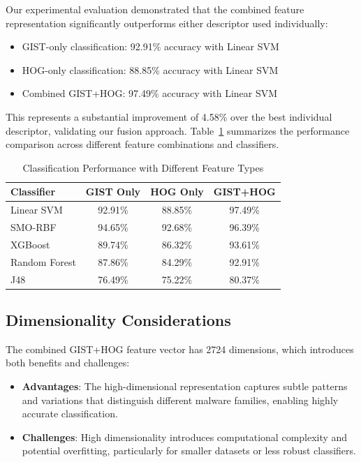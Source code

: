 Our experimental evaluation demonstrated that the combined feature representation significantly outperforms either descriptor used individually:

\begin{itemize}
    \item GIST-only classification: 92.91\% accuracy with Linear SVM
    \item HOG-only classification: 88.85\% accuracy with Linear SVM
    \item Combined GIST+HOG: 97.49\% accuracy with Linear SVM
\end{itemize}

This represents a substantial improvement of 4.58\% over the best individual descriptor, validating our fusion approach. Table~\ref{tab:feature-comparison} summarizes the performance comparison across different feature combinations and classifiers.

\begin{table}[!htbp]
    \centering
    \caption{Classification Performance with Different Feature Types}
    \label{tab:feature-comparison}
    \begin{tabular}{|l|c|c|c|}
    \hline
    \textbf{Classifier} & \textbf{GIST Only} & \textbf{HOG Only} & \textbf{GIST+HOG} \\
    \hline
    Linear SVM & 92.91\% & 88.85\% & 97.49\% \\
    SMO-RBF & 94.65\% & 92.68\% & 96.39\% \\
    XGBoost & 89.74\% & 86.32\% & 93.61\% \\
    Random Forest & 87.86\% & 84.29\% & 92.91\% \\
    J48 & 76.49\% & 75.22\% & 80.37\% \\
    \hline
    \end{tabular}
\end{table}

\subsection{Dimensionality Considerations}
\label{subsec:dimensionality}

The combined GIST+HOG feature vector has 2724 dimensions, which introduces both benefits and challenges:

\begin{itemize}
    \item \textbf{Advantages}: The high-dimensional representation captures subtle patterns and variations that distinguish different malware families, enabling highly accurate classification.
    
    \item \textbf{Challenges}: High dimensionality introduces computational complexity and potential overfitting, particularly for smaller datasets or less robust classifiers.
\end{itemize}

